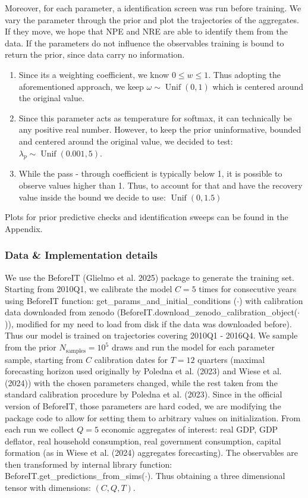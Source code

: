 \documentclass[12pt]{article}
\begin{document}
Moreover, for each parameter, a identification screen was run before training. We vary the parameter through the prior and plot the trajectories of the aggregates. If they move, we hope that NPE and NRE are able to identify them from the data. If the parameters do not influence the observables training is bound to return the prior, since data carry no information. 

\begin{enumerate}
    \item [$\omega$: ] Since its a weighting coefficient, we know $0 \leq w \leq1$. Thus adopting the aforementioned approach, we keep $\omega \sim \operatorname{Unif}(0, 1)$ which is centered around the original value.
    
    \item [$\lambda_p$: ] Since this parameter acts as temperature for softmax, it can technically be any positive real number. However, to keep the prior uninformative, bounded and centered around the original value, we decided to test: $\lambda_p \sim \operatorname{Unif}(0.001, 5)$.

    \item [$\bar{\pi}$: ] While the pass - through coefficient is typically below 1, it is possible to observe values higher than 1. Thus, to account for that and have the recovery value inside the bound we decide to use: $\operatorname{Unif}(0, 1.5)$
\end{enumerate}
Plots for prior predictive checks and identification sweeps can be found in the Appendix.

\subsubsection*{Data \& Implementation details}
We use the BeforeIT (Glielmo et al. 2025) package to generate the training set. Starting from 2010Q1, we calibrate the model $C = 5$ times for consecutive years using BeforeIT function: get\_params\_and\_initial\_conditions ($\cdot$) with calibration data downloaded from zenodo (BeforeIT.download\_zenodo\_calibration\_object($\cdot $)), modified for my need to load from disk if the data was downloaded before). Thus our model is trained on trajectories covering 2010Q1 - 2016Q4. We sample from the prior $N_\text{samples} = 10^5$ draws and run the model for each parameter sample, starting from $C$ calibration dates for $T = 12$ quarters (maximal forecasting horizon used originally by Poledna et al. (2023) and Wiese et al. (2024)) with the chosen parameters changed, while the rest taken from the standard calibration procedure by Poledna et al. (2023). Since in the official version of BeforeIT, those parameters are hard coded, we are modifying the package code to allow for setting them to arbitrary values on initialization. From each run we collect $Q = 5$ economic aggregates of interest: real GDP, GDP deflator, real household consumption, real government consumption, capital formation (as in Wiese et al. (2024) aggregates forecasting). The observables are then transformed by internal library function: BeforeIT.get\_predictions\_from\_sims($\cdot$). Thus obtaining a three dimensional tensor with dimensions: $(C, Q, T)$. 
\end{document}
